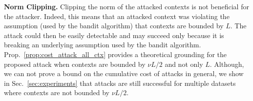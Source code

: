 \textbf{Norm Clipping.} Clipping the norm of the attacked contexts is not beneficial for the attacker. Indeed, this means that an attacked context was violating the assumption (used by the bandit algorithm) that contexts are bounded by $L$. The attack could then be easily detectable and may succeed only because it is breaking an underlying assumption used by the bandit algorithm. Prop.~\ref{prop:cost_attack_all_ctx} provides a theoretical grounding for the proposed attack when contexts are bounded by $\nu L/2$ and not only $L$.
Although, we can not prove a bound on the cumulative cost of attacks in general, we show in Sec.~\ref{sec:experiments} that attacks are still successful for multiple datasets where contexts are not bounded by $\nu L/2$. 



  


